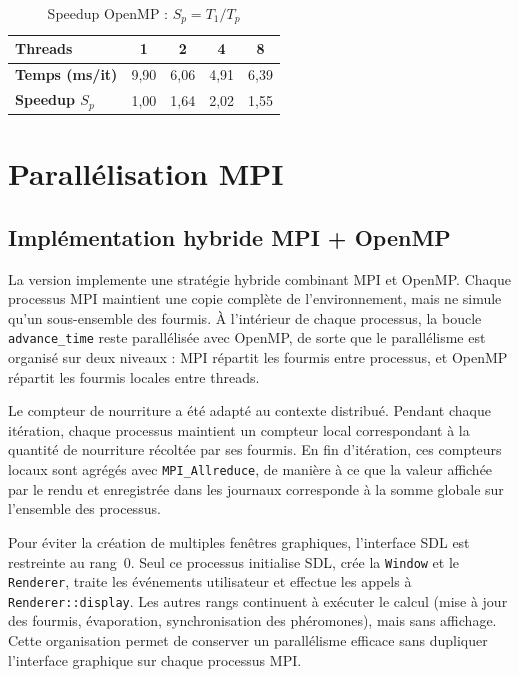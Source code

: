 \documentclass[12pt,a4paper]{article}
\begin{document}
\begin{table}[H]
    \centering
    \caption{Speedup OpenMP : $S_p = T_1 / T_p$}
    \begin{tabular}{lcccc}
        \toprule
        \textbf{Threads} & \textbf{1} & \textbf{2} & \textbf{4} & \textbf{8} \\
        \midrule
        \textbf{Temps (ms/it)} 
            & 9{,}90 
            & 6{,}06 
            & 4{,}91 
            & 6{,}39 \\
        \textbf{Speedup $S_p$} 
            & 1{,}00 
            & 1{,}64 
            & 2{,}02 
            & 1{,}55 \\
        \bottomrule
    \end{tabular}
\end{table}

\section{Parallélisation MPI}
\label{sec:mpi}

\subsection{Implémentation hybride MPI + OpenMP}

La version implemente une stratégie hybride combinant MPI et OpenMP. Chaque processus MPI maintient une copie complète de l'environnement, mais ne simule qu'un sous-ensemble des fourmis. À l'intérieur de chaque processus, la boucle \texttt{advance\_time} reste parallélisée avec OpenMP, de sorte que le parallélisme est organisé sur deux niveaux : MPI répartit les fourmis entre processus, et OpenMP répartit les fourmis locales entre threads.

Le compteur de nourriture a été adapté au contexte distribué. Pendant chaque itération, chaque processus maintient un compteur local correspondant à la quantité de nourriture récoltée par ses fourmis. En fin d'itération, ces compteurs locaux sont agrégés avec \texttt{MPI\_Allreduce}, de manière à ce que la valeur affichée par le rendu et enregistrée dans les journaux corresponde à la somme globale sur l'ensemble des processus.

Pour éviter la création de multiples fenêtres graphiques, l'interface SDL est restreinte au rang~0. Seul ce processus initialise SDL, crée la \texttt{Window} et le \texttt{Renderer}, traite les événements utilisateur et effectue les appels à \texttt{Renderer::display}. Les autres rangs continuent à exécuter le calcul (mise à jour des fourmis, évaporation, synchronisation des phéromones), mais sans affichage. Cette organisation permet de conserver un parallélisme efficace sans dupliquer l'interface graphique sur chaque processus MPI.
\end{document}
